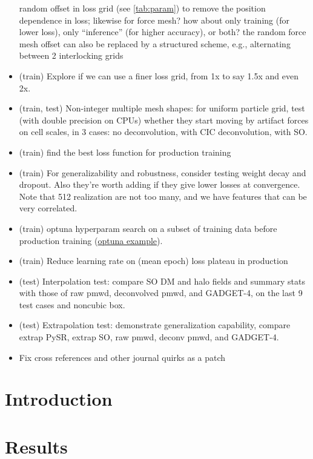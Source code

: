 \documentclass[modern, trackchanges, dvipsnames]{aastex631}
\newcommand{\GADGET}{{{\fontsize{10pt}{12pt}\selectfont GADGET}-4}}
\begin{document}
\begin{itemize}
  random offset in loss grid (see \autoref{tab:param}) to remove the
  position dependence in loss; likewise for force mesh? how about only
  training (for lower loss), only ``inference'' (for higher accuracy),
  or both? the random force mesh offset can also be replaced by a
  structured scheme, e.g., alternating between 2 interlocking grids
\item (train) Explore if we can use a finer loss grid, from 1x to say
  1.5x and even 2x.
\item (train, test) Non-integer multiple mesh shapes: for uniform
  particle grid, test (with double precision on CPUs) whether they start
  moving by artifact forces on cell scales, in 3 cases: no
  deconvolution, with CIC deconvolution, with SO.
\item (train) find the best loss function for production training
\item (train) For generalizability and robustness, consider testing
  weight decay and dropout. Also they're worth adding if they give lower
  losses at convergence. Note that 512 realization are not too many, and
  we have features that can be very correlated.
\item (train) optuna hyperparam search on a subset of training data
  before production training
  (\href{https://github.com/optuna/optuna-examples/blob/main/haiku/haiku_simple.py}{optuna example}).
\item (train) Reduce learning rate on (mean epoch) loss plateau in
  production
\item (test) Interpolation test: compare SO DM and halo fields and
  summary stats with those of raw pmwd, deconvolved pmwd, and \GADGET,
  on the last 9 test cases and noncubic box.
\item (test) Extrapolation test: demonstrate generalization capability,
  compare extrap PySR, extrap SO, raw pmwd, deconv pmwd, and \GADGET.
\item Fix cross references and other journal quirks as a patch
\end{itemize}


\vspace{1em}
\section{Introduction}


\vspace{1em}
\section{Results}
\end{document}
